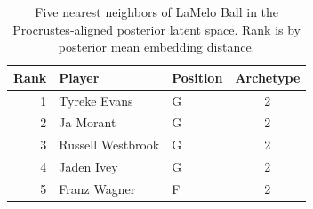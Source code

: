 \begin{table}[htbp]
  \centering\small
  \begin{tabular}{rllc}
    \toprule
    Rank & Player & Position & Archetype \\
    \midrule
    1 & Tyreke Evans & G & 2 \\
    2 & Ja Morant & G & 2 \\
    3 & Russell Westbrook & G & 2 \\
    4 & Jaden Ivey & G & 2 \\
    5 & Franz Wagner & F & 2 \\
    \bottomrule
  \end{tabular}
  \caption{Five nearest neighbors of LaMelo Ball in the Procrustes-aligned posterior latent space. Rank is by posterior mean embedding distance.}
  \label{tab:LaMelo_Ball_neighbors}
\end{table}

